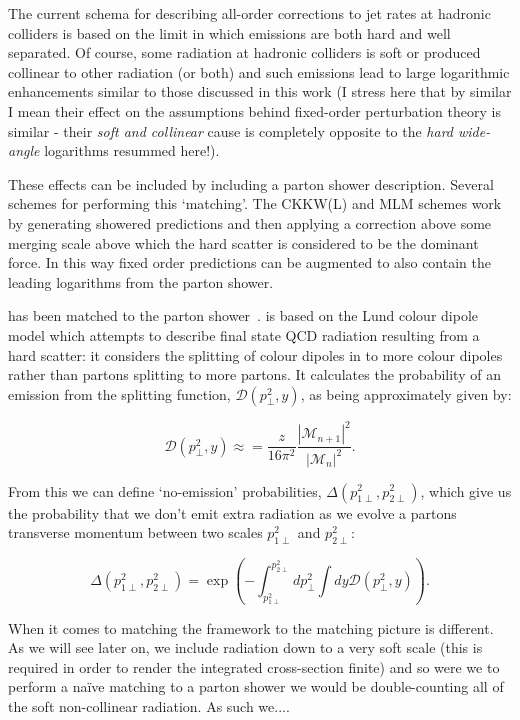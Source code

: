 		The current schema for describing all-order corrections to jet rates at hadronic colliders
		is based on the limit in which emissions are both hard and well separated.  Of course, some
		radiation at hadronic colliders is soft or produced collinear to other radiation (or both)
		and such emissions lead to large logarithmic enhancements similar to those discussed in this
		work (I stress here that by similar I mean their effect on the assumptions behind fixed-order
		perturbation theory is similar - their \emph{soft and collinear} cause is completely opposite
		to the \emph{hard wide-angle} logarithms resummed here!).

		These effects can be included by including a parton shower description.  Several schemes for
		performing this `matching'.  The CKKW(L) and MLM schemes work by generating showered predictions
		and then applying a correction above some merging scale above which the hard scatter is considered
		to be the dominant force.  In this way fixed order predictions can be augmented to also contain the
		leading logarithms from the parton shower.

		\HEJ has been matched to the \ARIADNE parton shower~\cite{Andersen:2011zd}.  \ARIADNE is based on
		the Lund colour dipole model which attempts to describe final state QCD radiation resulting from
		a hard scatter: it considers the splitting of colour dipoles in to more colour dipoles rather than
		partons splitting to more partons.  It calculates the probability of an emission from the splitting
		function, $\mathcal{D}(p_\perp^2, y)$, as being approximately given by:

		\begin{equation}
			\mathcal{D}(p_\perp^2, y) \approx = \frac{z}{16\pi^2}\frac{|\mathcal{M}_{n+1}|^2}{|\mathcal{M}_{n}|^2}.
		\end{equation}

		From this we can define `no-emission' probabilities, $\Delta(p_{1\perp}^2, p_{2\perp}^2)$, which
		give us the probability that we don't emit extra radiation as we evolve a partons transverse
		momentum between two scales $p_{1\perp}^2$ and $p_{2\perp}^2$:

		\begin{equation}
			\Delta(p_{1\perp}^2, p_{2\perp}^2) = \exp\left(-\int_{p_{1\perp}^2}^{p_{2\perp}^2}dp_{\perp}^2
			\int dy\mathcal{D}(p_\perp^2, y)\right).
		\end{equation}

		When it comes to matching the \hej framework to \ARIADNE the matching picture is different.
		As we will see later on, we include radiation down to a very soft scale (this is required in
		order to render the integrated cross-section finite) and so were we to perform a na\"ive
		matching to a parton shower we would be double-counting all of the soft non-collinear radiation.
		As such we....

